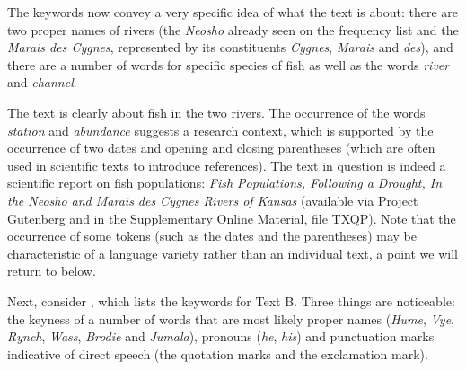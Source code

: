 The keywords  now convey a very specific idea of what the text is about: there are two proper names of rivers (the \textit{Neosho} already seen on the frequency  list and the \textit{Marais des Cygnes}, represented by its constituents \textit{Cygnes}, \textit{Marais} and \textit{des}), and there are a number of words for specific species of fish as well as the words \textit{river} and \textit{channel}.

The text is clearly about fish in the two rivers. The occurrence of the words \textit{station} and \textit{abundance} suggests a research context, which is supported by the occurrence of two dates and opening and closing parentheses (which are often used in scientific texts to introduce references). The text in question is indeed a scientific report on fish populations: \textit{Fish Populations, Following a Drought, In the Neosho and Marais des Cygnes Rivers of Kansas} (available via Project Gutenberg and in the Supplementary Online Material, file TXQP). Note that the occurrence of some tokens  (such as the dates and the parentheses) may be characteristic of a language variety  rather than an individual text, a point we will return to below.

Next, consider , which lists the keywords  for Text B. Three things are noticeable: the keyness  of a number of words that are most likely proper names (\textit{Hume}, \textit{Vye}, \textit{Rynch}, \textit{Wass}, \textit{Brodie} and \textit{Jumala}), pronouns  (\textit{he}, \textit{his}) and punctuation marks indicative of direct speech (the quotation marks and the exclamation mark).

